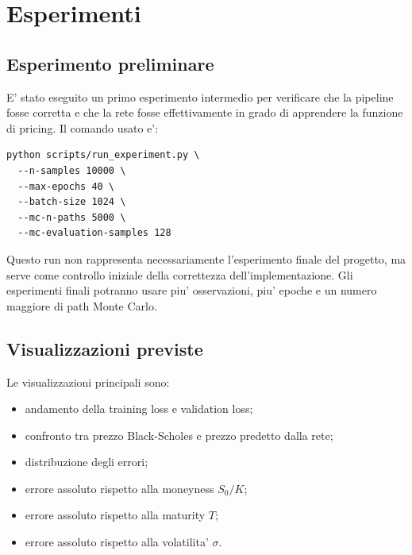 \section{Esperimenti}

\subsection{Esperimento preliminare}

E' stato eseguito un primo esperimento intermedio per verificare che la pipeline fosse corretta e che la rete fosse effettivamente in grado di apprendere la funzione di pricing.
Il comando usato e':

\begin{lstlisting}[style=pythonstyle, caption={Comando per un esperimento preliminare.}]
python scripts/run_experiment.py \
  --n-samples 10000 \
  --max-epochs 40 \
  --batch-size 1024 \
  --mc-n-paths 5000 \
  --mc-evaluation-samples 128
\end{lstlisting}

Questo run non rappresenta necessariamente l'esperimento finale del progetto, ma serve come controllo iniziale della correttezza dell'implementazione.
Gli esperimenti finali potranno usare piu' osservazioni, piu' epoche e un numero maggiore di path Monte Carlo.

\subsection{Visualizzazioni previste}

Le visualizzazioni principali sono:

\begin{itemize}
    \item andamento della training loss e validation loss;
    \item confronto tra prezzo Black-Scholes e prezzo predetto dalla rete;
    \item distribuzione degli errori;
    \item errore assoluto rispetto alla moneyness $S_0/K$;
    \item errore assoluto rispetto alla maturity $T$;
    \item errore assoluto rispetto alla volatilita' $\sigma$.
\end{itemize}

